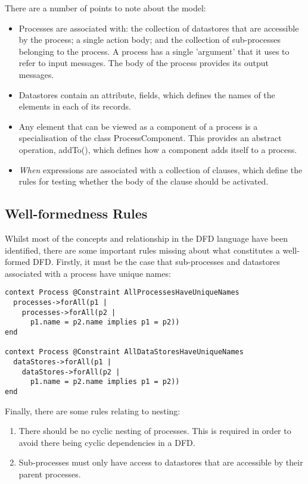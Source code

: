 There are a number of points to note about the model:

\begin{itemize}
\item Processes are associated with: the collection of datastores that
are accessible by the process; a single action body; and the collection
of sub-processes belonging to the process. A process has a single 'argument'
that it uses to refer to input messages. The body of the process provides
its output messages.
\item Datastores contain an attribute, fields, which defines the names
of the elements in each of its records.
\item Any element that can be viewed as a component of a process is a
specialisation of the class ProcessComponent. This provides an abstract
operation, addTo(), which defines how a component adds itself to a process.
\item {\it When} expressions are associated with a collection of clauses,
which define the rules for testing whether the body of the clause should
be activated.
\end{itemize}

\subsection{Well-formedness Rules}

Whilst most of the concepts and relationship in the DFD language
have been identified,  there are some important rules missing about
what constitutes a well-formed DFD. Firstly, it must be the case
that sub-processes and datastores associated with a process have
unique names:


\begin{lstlisting}
context Process @Constraint AllProcessesHaveUniqueNames
  processes->forAll(p1 |
    processes->forAll(p2 |
      p1.name = p2.name implies p1 = p2))
end

context Process @Constraint AllDataStoresHaveUniqueNames
  dataStores->forAll(p1 |
    dataStores->forAll(p2 |
      p1.name = p2.name implies p1 = p2))
end
\end{lstlisting}
Finally, there are some rules relating to nesting:

\begin{enumerate}
\item There should be no cyclic nesting of processes. This is
required in order to avoid there being cyclic dependencies in a DFD.
\item Sub-processes must only have access to datastores that
are accessible by their parent processes.
\end{enumerate}

